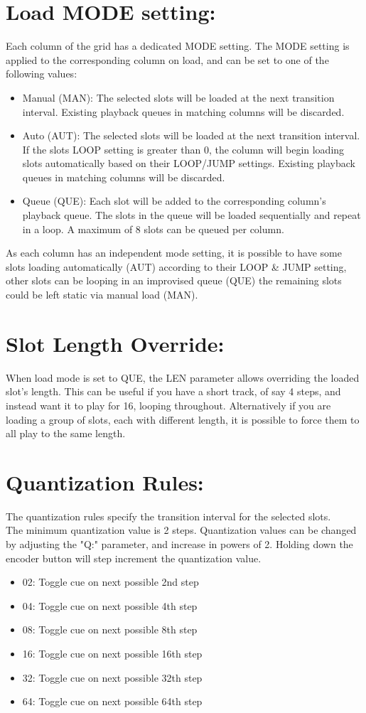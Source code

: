 \section{Load MODE setting:}
Each column of the grid has a dedicated MODE setting. The MODE setting is applied to the corresponding column on load, and can be set to one of the following values:

\begin{itemize}
    \item Manual (MAN):  The selected slots will be loaded at the next transition interval. Existing playback queues in matching columns will be discarded.
    \item Auto (AUT): The selected slots will be loaded at the next transition interval. If the slots LOOP setting is greater than 0, the column will begin loading slots automatically based on their LOOP/JUMP settings. Existing playback queues in matching columns will be discarded.
    \item Queue (QUE): Each slot will be added to the corresponding column's playback queue. The slots in the queue will be loaded sequentially and repeat in a loop. A maximum of 8 slots can be queued per column. 
\end{itemize}

As each column has an independent mode setting, it is possible to have some slots loading automatically (AUT) according to their LOOP \& JUMP setting, other slots can be looping in an improvised queue (QUE) the remaining slots could be left static via manual load (MAN).
\newpage
\section{Slot Length Override:}
When load mode is set to QUE, the LEN parameter allows overriding the loaded slot's length. This can be useful if you have a short track, of say 4 steps, and instead want it to play for 16, looping throughout. Alternatively if you are loading a group of slots, each with different length, it is possible to force them to all play to the same length.

\section{Quantization Rules:}
The quantization rules specify the transition interval for the selected slots.\\
The minimum quantization value is 2 steps. Quantization values can be changed by adjusting the "Q:" parameter, and increase in powers of 2. Holding down the encoder button will step increment the quantization value.
\begin{itemize}
\item 02: Toggle cue on next possible 2nd step
\item 04: Toggle cue on next possible 4th step
\item 08: Toggle cue on next possible 8th step 
\item 16: Toggle cue on next possible 16th step 
\item 32: Toggle cue on next possible 32th step 
\item 64: Toggle cue on next possible 64th step
\end{itemize}
